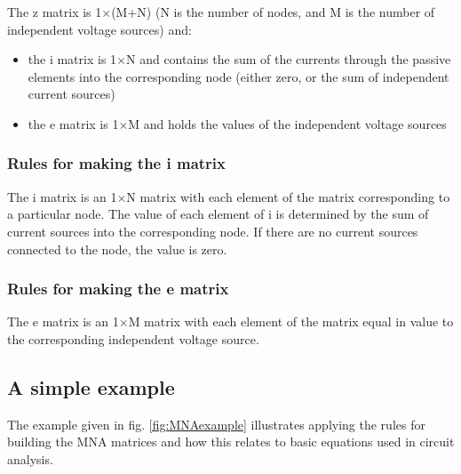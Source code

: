 The z matrix is 1$\times$(M+N) (N is the number of nodes, and M is the
number of independent voltage sources) and:

\begin{itemize}
\item
the i matrix is 1$\times$N and contains the sum of the currents through the
passive elements into the corresponding node (either zero, or the sum
of independent current sources)
\item
the e matrix is 1$\times$M and holds the values of the independent
voltage sources
\end{itemize}

\subsubsection{Rules for making the i matrix}

The i matrix is an 1$\times$N matrix with each element of the matrix
corresponding to a particular node.  The value of each element of i is
determined by the sum of current sources into the corresponding node.
If there are no current sources connected to the node, the value is
zero.

\subsubsection{Rules for making the e matrix}

The e matrix is an 1$\times$M matrix with each element of the matrix
equal in value to the corresponding independent voltage source.

\subsection{A simple example}

The example given in fig. \ref{fig:MNAexample} illustrates applying
the rules for building the MNA matrices and how this relates to basic
equations used in circuit analysis.

